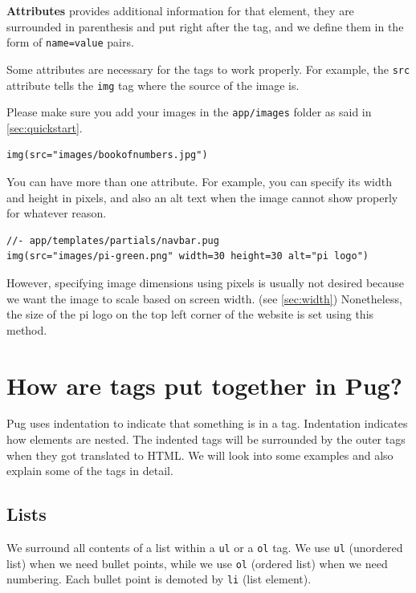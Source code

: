 \textbf{Attributes} provides additional information for that element, they are surrounded in parenthesis and put right after the tag, and we define them in the form of \texttt{name=value} pairs.

Some attributes are necessary for the tags to work properly. For example, the \texttt{src} attribute tells the \texttt{img} tag where the source of the image is. 

Please make sure you add your images in the \texttt{app/images} folder as said in \cref{sec:quickstart}.
\vspace{6mm}

\begin{lstlisting}[language=pug]
img(src="images/bookofnumbers.jpg")
\end{lstlisting}

You can have more than one attribute. For example, you can specify its width and height in pixels, and also an alt text when the image cannot show properly for whatever reason.

\begin{lstlisting}[language=pug]
//- app/templates/partials/navbar.pug
img(src="images/pi-green.png" width=30 height=30 alt="pi logo")
\end{lstlisting}

However, specifying image dimensions using pixels is usually not desired because we want the image to scale based on screen width. (see \cref{sec:width}) Nonetheless, the size of the pi logo on the top left corner of the website is set using this method.

\section{How are tags put together in Pug?}

Pug uses indentation to indicate that something is in a tag. Indentation indicates how elements are nested. The indented tags will be surrounded by the outer tags when they got translated to HTML. We will look into some examples and also explain some of the tags in detail. 

\subsection*{Lists}
\label{sec:list}

We surround all contents of a list within a \texttt{ul} or a \texttt{ol} tag. We use \texttt{ul} (unordered list) when we need bullet points, while we use \texttt{ol} (ordered list) when we need numbering. Each bullet point is demoted by \texttt{li} (list element).

